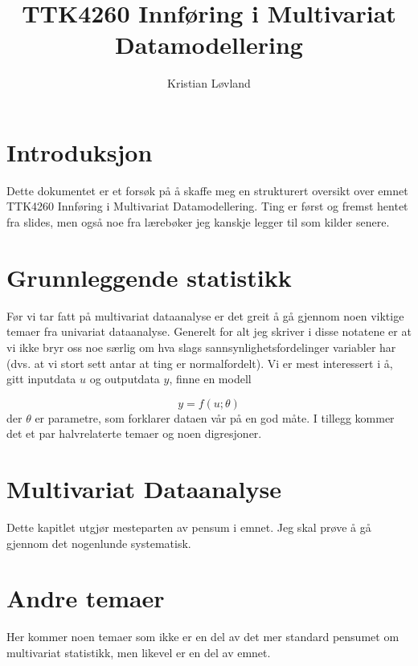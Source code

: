 \documentclass[12pt]{article}
\title{TTK4260 Innføring i Multivariat Datamodellering}
\date{}
\author{Kristian Løvland}
\begin{document}
\maketitle
\tableofcontents

\newpage
\section{Introduksjon}
Dette dokumentet er et forsøk på å skaffe meg en strukturert oversikt over emnet TTK4260 Innføring i Multivariat Datamodellering. Ting er først og fremst hentet fra slides, men også noe fra lærebøker jeg kanskje legger til som kilder senere.

\newpage
\section{Grunnleggende statistikk}
Før vi tar fatt på multivariat dataanalyse er det greit å gå gjennom noen viktige temaer fra univariat dataanalyse. Generelt for alt jeg skriver i disse notatene er at vi ikke bryr oss noe særlig om hva slags sannsynlighetsfordelinger variabler har (dvs. at vi stort sett antar at ting er normalfordelt). Vi er mest interessert i å, gitt inputdata $u$ og outputdata $y$, finne en modell

\begin{equation}
	y = f(u; \theta)
\end{equation}
der $\theta$ er parametre, som forklarer dataen vår på en god måte. I tillegg kommer det et par halvrelaterte temaer og noen digresjoner.

% 






\section{Multivariat Dataanalyse}
Dette kapitlet utgjør mesteparten av pensum i emnet. Jeg skal prøve å gå gjennom det nogenlunde systematisk.








\section{Andre temaer}
Her kommer noen temaer som ikke er en del av det mer standard pensumet om multivariat statistikk, men likevel er en del av emnet.



\newpage
\end{document}
